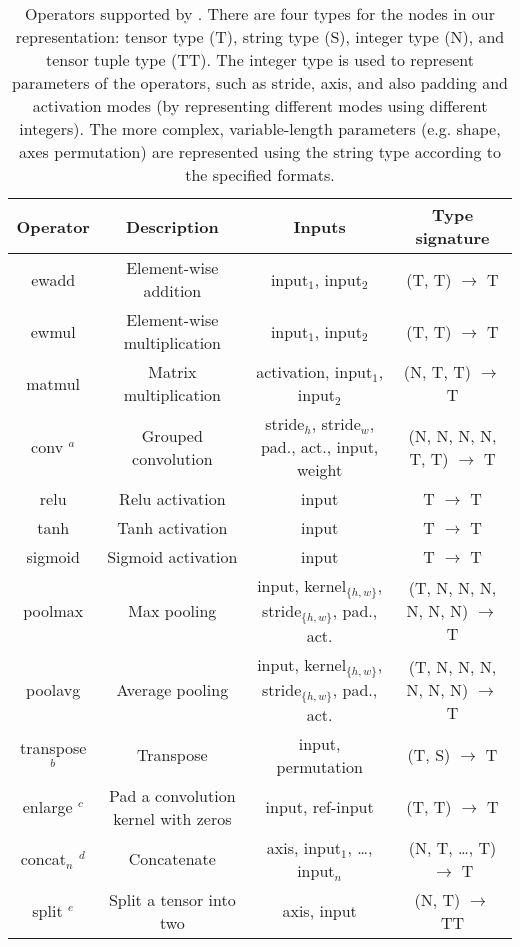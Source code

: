 \begin{table}[t]
    \small
    {\centering
    \caption{Operators supported by \ourname.
    There are four types for the nodes in our representation:
    tensor type (T), string type (S), integer type (N), and tensor tuple type (TT).
    The integer type is used to represent parameters of the operators, such as stride, axis, and also padding and activation modes (by representing different modes using different integers).
    The more complex, variable-length parameters (e.g. shape, axes permutation) are represented using the string type according to the specified formats. }
    \label{table:ops}
    \begin{tabular}{cccc}
    \hline
        {\bf Operator} & {\bf Description} & {\bf Inputs} & {\bf Type signature} \\
    \hline
        ewadd & Element-wise addition & input$_1$, input$_2$ & (T, T) $\rightarrow$ T  \\
        ewmul & Element-wise multiplication & input$_1$, input$_2$ & (T, T) $\rightarrow$ T \\
        matmul & Matrix multiplication & activation, input$_1$, input$_2$ & (N, T, T) $\rightarrow$ T \\
        conv $^a$ & Grouped convolution & stride$_h$, stride$_w$, pad., act., input, weight & (N, N, N, N, T, T) $\rightarrow$ T \\
        relu & Relu activation & input & T $\rightarrow$ T \\
        tanh & Tanh activation & input & T $\rightarrow$ T \\
        sigmoid & Sigmoid activation & input & T $\rightarrow$ T \\
        poolmax & Max pooling & {input, kernel$_{\{h,w\}}$, stride$_{\{h,w\}}$, pad., act.}  & (T, N, N, N, N, N, N) $\rightarrow$ T \\
        poolavg & Average pooling & {input, kernel$_{\{h,w\}}$, stride$_{\{h,w\}}$, pad., act.} & (T, N, N, N, N, N, N) $\rightarrow$ T \\
        transpose $^b$ & Transpose & input, permutation & (T, S) $\rightarrow$ T \\
        enlarge $^c$ & Pad a convolution kernel with zeros & input, ref-input & (T, T) $\rightarrow$ T \\
        concat$_n$ $^d$ & Concatenate & axis, input$_1$, \dots, input$_n$ & (N, T, \dots, T) $\rightarrow$ T \\
        split $^e$ & Split a tensor into two & axis, input & (N, T) $\rightarrow$ TT \\

\end{tabular}}
\end{table}
